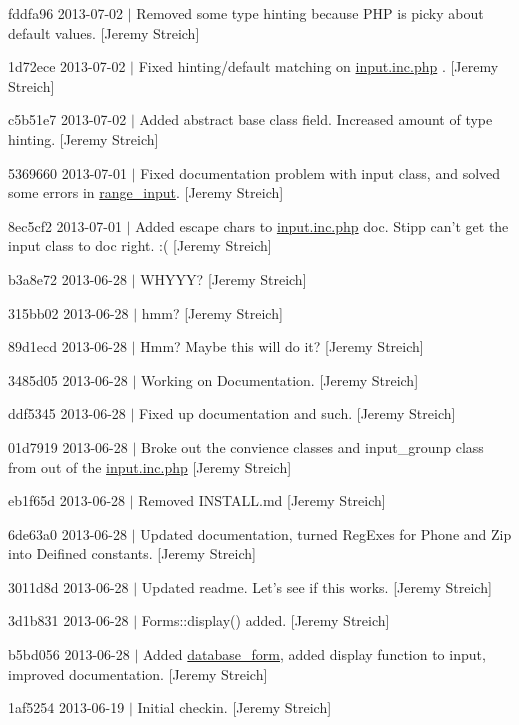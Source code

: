 \begin{DoxyItemize}
\item fddfa96 2013-\/07-\/02 $|$ Removed some type hinting because P\-H\-P is picky about default values. \mbox{[}Jeremy Streich\mbox{]}
\item 1d72ece 2013-\/07-\/02 $|$ Fixed hinting/default matching on \hyperlink{input_8inc_8php}{input.\-inc.\-php} . \mbox{[}Jeremy Streich\mbox{]}
\item c5b51e7 2013-\/07-\/02 $|$ Added abstract base class field. Increased amount of type hinting. \mbox{[}Jeremy Streich\mbox{]}
\item 5369660 2013-\/07-\/01 $|$ Fixed documentation problem with input class, and solved some errors in \hyperlink{classrange__input}{range\-\_\-input}. \mbox{[}Jeremy Streich\mbox{]}
\item 8ec5cf2 2013-\/07-\/01 $|$ Added escape chars to \hyperlink{input_8inc_8php}{input.\-inc.\-php} doc. Stipp can't get the input class to doc right. \-:( \mbox{[}Jeremy Streich\mbox{]}
\item b3a8e72 2013-\/06-\/28 $|$ W\-H\-Y\-Y\-Y? \mbox{[}Jeremy Streich\mbox{]}
\item 315bb02 2013-\/06-\/28 $|$ hmm? \mbox{[}Jeremy Streich\mbox{]}
\item 89d1ecd 2013-\/06-\/28 $|$ Hmm? Maybe this will do it? \mbox{[}Jeremy Streich\mbox{]}
\item 3485d05 2013-\/06-\/28 $|$ Working on Documentation. \mbox{[}Jeremy Streich\mbox{]}
\item ddf5345 2013-\/06-\/28 $|$ Fixed up documentation and such. \mbox{[}Jeremy Streich\mbox{]}
\item 01d7919 2013-\/06-\/28 $|$ Broke out the convience classes and input\-\_\-grounp class from out of the \hyperlink{input_8inc_8php}{input.\-inc.\-php} \mbox{[}Jeremy Streich\mbox{]}
\item eb1f65d 2013-\/06-\/28 $|$ Removed I\-N\-S\-T\-A\-L\-L.\-md \mbox{[}Jeremy Streich\mbox{]}
\item 6de63a0 2013-\/06-\/28 $|$ Updated documentation, turned Reg\-Exes for Phone and Zip into Deifined constants. \mbox{[}Jeremy Streich\mbox{]}
\item 3011d8d 2013-\/06-\/28 $|$ Updated readme. Let's see if this works. \mbox{[}Jeremy Streich\mbox{]}
\item 3d1b831 2013-\/06-\/28 $|$ Forms\-::display() added. \mbox{[}Jeremy Streich\mbox{]}
\item b5bd056 2013-\/06-\/28 $|$ Added \hyperlink{classdatabase__form}{database\-\_\-form}, added display function to input, improved documentation. \mbox{[}Jeremy Streich\mbox{]}
\item 1af5254 2013-\/06-\/19 $|$ Initial checkin. \mbox{[}Jeremy Streich\mbox{]} 
\end{DoxyItemize}
